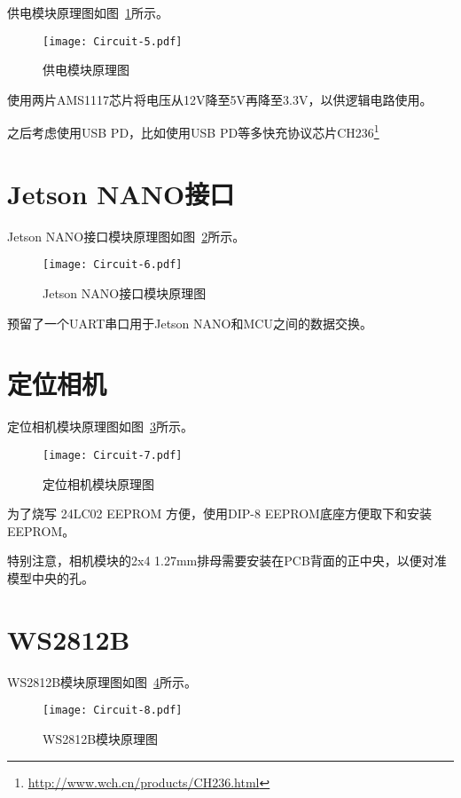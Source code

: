 供电模块原理图如图~\ref{fig:Circuit-5}所示。

\begin{figure}[htbp]
    \centering
    \texttt{[image: Circuit-5.pdf]}
    \caption{供电模块原理图}
    \label{fig:Circuit-5}
\end{figure}

使用两片AMS1117芯片将电压从12V降至5V再降至3.3V，以供逻辑电路使用。

之后考虑使用USB PD，比如使用USB PD等多快充协议芯片CH236\footnote{\url{http://www.wch.cn/products/CH236.html}}

\section{Jetson NANO接口}

Jetson NANO接口模块原理图如图~\ref{fig:Circuit-6}所示。

\begin{figure}[htbp]
    \centering
    \texttt{[image: Circuit-6.pdf]}
    \caption{Jetson NANO接口模块原理图}
    \label{fig:Circuit-6}
\end{figure}

预留了一个UART串口用于Jetson NANO和MCU之间的数据交换。

\section{定位相机}

定位相机模块原理图如图~\ref{fig:Circuit-7}所示。

\begin{figure}[htbp]
    \centering
    \texttt{[image: Circuit-7.pdf]}
    \caption{定位相机模块原理图}
    \label{fig:Circuit-7}
\end{figure}

为了烧写 24LC02 EEPROM 方便，使用DIP-8 EEPROM底座方便取下和安装EEPROM。

特别注意，相机模块的2x4 1.27mm排母需要安装在PCB背面的正中央，以便对准模型中央的孔。

\section{WS2812B}

WS2812B模块原理图如图~\ref{fig:Circuit-8}所示。

\begin{figure}[htbp]
    \centering
    \texttt{[image: Circuit-8.pdf]}
    \caption{WS2812B模块原理图}
    \label{fig:Circuit-8}
\end{figure}

